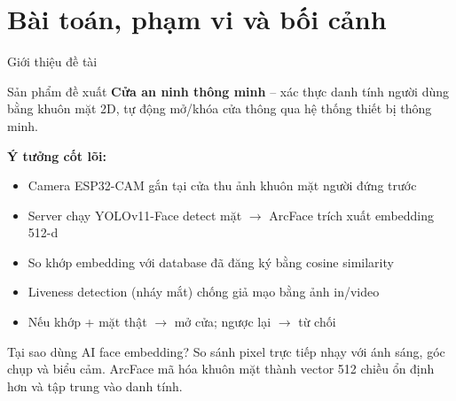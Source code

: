 \documentclass[aspectratio=169]{beamer}
\begin{document}
\section{Bài toán, phạm vi và bối cảnh}

\begin{frame}{Giới thiệu đề tài}
  \footnotesize
  \begin{block}{Sản phẩm đề xuất}
    \textbf{Cửa an ninh thông minh} -- xác thực danh tính người dùng bằng khuôn mặt 2D, tự động mở/khóa cửa thông qua hệ thống thiết bị thông minh.
  \end{block}

  \vspace{0.25em}
  \textbf{Ý tưởng cốt lõi:}
  \begin{itemize}\setlength{\itemsep}{0.1em}
    \item Camera ESP32-CAM gắn tại cửa thu ảnh khuôn mặt người đứng trước
    \item Server chạy YOLOv11-Face detect mặt $\to$ ArcFace trích xuất embedding 512-d
    \item So khớp embedding với database đã đăng ký bằng cosine similarity
    \item Liveness detection (nháy mắt) chống giả mạo bằng ảnh in/video
    \item Nếu khớp + mặt thật $\to$ mở cửa; ngược lại $\to$ từ chối
  \end{itemize}

  \vspace{0.25em}
  \begin{alertblock}{Tại sao dùng AI face embedding?}
    So sánh pixel trực tiếp nhạy với ánh sáng, góc chụp và biểu cảm.
    ArcFace mã hóa khuôn mặt thành vector 512 chiều ổn định hơn và tập trung vào danh tính.
  \end{alertblock}
\end{frame}
\end{document}
